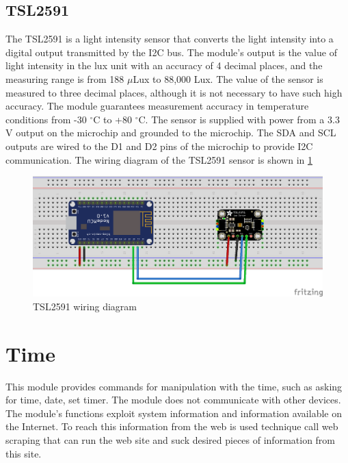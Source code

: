 \subsection{TSL2591}

The TSL2591 \citep{TSL2591_Datasheet} is a light intensity sensor that converts the light intensity into a digital output transmitted by the I2C bus. The module's output is the value of light intensity in the lux unit with an accuracy of 4 decimal places, and the measuring range is from 188 $\mu$Lux to 88,000 Lux. The value of the sensor is measured to three decimal places, although it is not necessary to have such high accuracy. The module guarantees measurement accuracy in temperature conditions from -30 $^{\circ}$C to +80 $^{\circ}$C. The sensor is supplied with power from a 3.3 V output on the microchip and grounded to the microchip. The SDA and SCL outputs are wired to the D1 and D2 pins of the microchip to provide I2C communication. The wiring diagram of the TSL2591 sensor is shown in \cref{fig:tsl2591_schema}

\begin{figure}[H]
	\centering
	\includegraphics[width=\textwidth]{img/tsl2591_schema.png}
	\caption{TSL2591 wiring diagram}
	\label{fig:tsl2591_schema}
\end{figure}

\section{Time}

This module provides commands for manipulation with the time, such as asking for time, date, set timer. The module does not communicate with other devices. The module's functions exploit system information and information available on the Internet. To reach this information from the web is used technique call web scraping that can run the web site and suck desired pieces of information from this site. 


